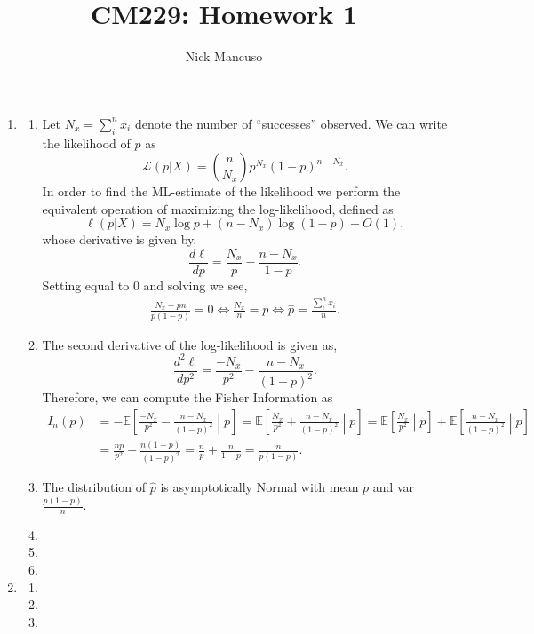 \documentclass[10pt]{article}
\def\E{\mathbb{E}}
\begin{document}
\title{CM229: Homework 1}
\author{Nick Mancuso}
\maketitle

\begin{enumerate}
\item
\begin{enumerate}
\item
Let $N_x = \sum_i^n x_i$ denote the number of ``successes'' observed. We can write the
likelihood of $p$ as \[ \mathcal{L}(p| X) = {n \choose N_x} p^{N_x} (1 - p)^{n - N_x}.\] In order
to find the ML-estimate of the likelihood we perform the equivalent operation of maximizing the
log-likelihood, defined as \[\ell(p | X) = N_x \log p + (n - N_x) \log (1 - p) + O(1),\] whose
derivative is given by, \[ \frac{d \ell}{d p} = \frac{N_x}{p} - \frac{n - N_x}{1 - p}.\] Setting
equal to 0 and solving we see,
\begin{align*}
    \frac{N_x - pn}{p(1 - p)} = 0 \Leftrightarrow 
    \frac{N_x}{n} = p \Leftrightarrow 
    \hat{p} = \frac{\sum_i^n x_i}{n}.
\end{align*}

\item
The second derivative of the log-likelihood is given as, 
\[ \frac{d^2 \ell}{d p^2} = \frac{-N_x}{p^2} - \frac{n - N_x}{(1 - p)^2}.\] Therefore, we can
compute the Fisher Information as
\begin{align*}
    I_n(p) &= -\E\left[\frac{-N_x}{p^2} - \frac{n - N_x}{(1 - p)^2} \middle\rvert p \right] = 
    \E\left[\frac{N_x}{p^2} + \frac{n - N_x}{(1 - p)^2} \middle\rvert p \right]
    = \E\left[\frac{N_x}{p^2} \middle\rvert p\right] + \E\left[\frac{n - N_x}{(1 - p)^2} \middle\rvert p \right] \\
    &= \frac{n p}{p^2} + \frac{n (1 - p)}{(1 - p)^2} = \frac{n}{p} + \frac{n}{1 - p} = \frac{n}{p(1 - p)}.
\end{align*}
\item
The distribution of $\hat{p}$ is asymptotically Normal with mean $p$ and var $\frac{p(1 - p)}{n}$.
\item
\item
\item
\end{enumerate}

\item
\begin{enumerate}
\item
\item
\item
\end{enumerate}


\end{enumerate}
\end{document}

